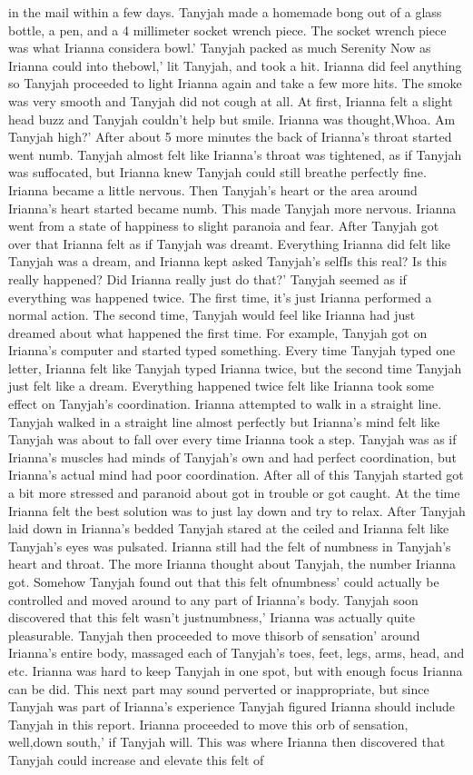 \documentclass[12pt]{book}
\begin{document}
in the mail within a few days. Tanyjah made a homemade bong out of a glass bottle, a pen, and a 4 millimeter socket wrench piece. The socket wrench piece was what Irianna considera bowl.' Tanyjah packed as much Serenity Now as Irianna could into thebowl,' lit Tanyjah, and took a hit. Irianna did feel anything so Tanyjah proceeded to light Irianna again and take a few more hits. The smoke was very smooth and Tanyjah did not cough at all. At first, Irianna felt a slight head buzz and Tanyjah couldn't help but smile. Irianna was thought,Whoa. Am Tanyjah high?' After about 5 more minutes the back of Irianna's throat started went numb. Tanyjah almost felt like Irianna's throat was tightened, as if Tanyjah was suffocated, but Irianna knew Tanyjah could still breathe perfectly fine. Irianna became a little nervous. Then Tanyjah's heart or the area around Irianna's heart started became numb. This made Tanyjah more nervous. Irianna went from a state of happiness to slight paranoia and fear. After Tanyjah got over that Irianna felt as if Tanyjah was dreamt. Everything Irianna did felt like Tanyjah was a dream, and Irianna kept asked Tanyjah's selfIs this real? Is this really happened? Did Irianna really just do that?' Tanyjah seemed as if everything was happened twice. The first time, it's just Irianna performed a normal action. The second time, Tanyjah would feel like Irianna had just dreamed about what happened the first time. For example, Tanyjah got on Irianna's computer and started typed something. Every time Tanyjah typed one letter, Irianna felt like Tanyjah typed Irianna twice, but the second time Tanyjah just felt like a dream. Everything happened twice felt like Irianna took some effect on Tanyjah's coordination. Irianna attempted to walk in a straight line. Tanyjah walked in a straight line almost perfectly but Irianna's mind felt like Tanyjah was about to fall over every time Irianna took a step. Tanyjah was as if Irianna's muscles had minds of Tanyjah's own and had perfect coordination, but Irianna's actual mind had poor coordination. After all of this Tanyjah started got a bit more stressed and paranoid about got in trouble or got caught. At the time Irianna felt the best solution was to just lay down and try to relax. After Tanyjah laid down in Irianna's bedded Tanyjah stared at the ceiled and Irianna felt like Tanyjah's eyes was pulsated. Irianna still had the felt of numbness in Tanyjah's heart and throat. The more Irianna thought about Tanyjah, the number Irianna got. Somehow Tanyjah found out that this felt ofnumbness' could actually be controlled and moved around to any part of Irianna's body. Tanyjah soon discovered that this felt wasn't justnumbness,' Irianna was actually quite pleasurable. Tanyjah then proceeded to move thisorb of sensation' around Irianna's entire body, massaged each of Tanyjah's toes, feet, legs, arms, head, and etc. Irianna was hard to keep Tanyjah in one spot, but with enough focus Irianna can be did. This next part may sound perverted or inappropriate, but since Tanyjah was part of Irianna's experience Tanyjah figured Irianna should include Tanyjah in this report. Irianna proceeded to move this orb of sensation, well,down south,' if Tanyjah will. This was where Irianna then discovered that Tanyjah could increase and elevate this felt of 
\end{document}
